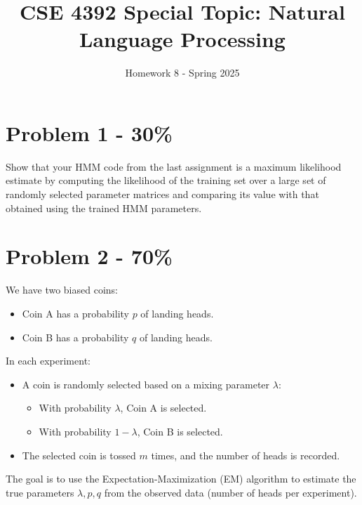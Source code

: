 \documentclass{article}
\begin{document}
\title{CSE 4392 Special Topic: Natural Language Processing}
\author{Homework 8 - Spring 2025}
\maketitle
\thispagestyle{fancy}

\section*{Problem 1 - 30\%}

Show that your HMM code from the last assignment is a maximum likelihood estimate by computing the likelihood of the training set over a large set of randomly selected parameter matrices and comparing its value with that obtained using the trained HMM parameters.

\section*{Problem 2 - 70\%}
We have two biased coins:
\begin{itemize}
    \item Coin A has a probability \( p \) of landing heads.
    \item Coin B has a probability \( q \) of landing heads.
\end{itemize}
In each experiment:
\begin{itemize}
    \item A coin is randomly selected based on a mixing parameter \( \lambda \):
    \begin{itemize}
        \item With probability \( \lambda \), Coin A is selected.
        \item With probability \( 1 - \lambda \), Coin B is selected.
    \end{itemize}
    \item The selected coin is tossed \( m \) times, and the number of heads is recorded.
\end{itemize}
The goal is to use the Expectation-Maximization (EM) algorithm to estimate the true parameters \( \lambda, p, q \) from the observed data (number of heads per experiment).
\end{document}
